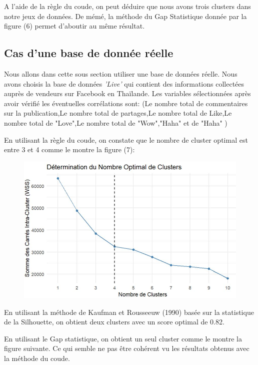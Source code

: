 A l'aide de la règle du coude, on peut déduire que nous avons trois clusters dans notre jeux de données. De mémé, la méthode du Gap Statistique donnée par la figure (6) permet d'aboutir au même résultat. 

\newpage
\subsection{Cas d'une base de donnée réelle}

Nous allons dans cette sous section utiliser une base de données réelle. Nous avons choisis la base de données \textit{'Live'} qui contient des informations collectées auprès de vendeurs sur Facebook en Thaïlande. Les variables sélectionnées après avoir vérifié les éventuelles corrélations sont: (Le nombre total de commentaires sur la publication,Le nombre total de partages,Le nombre total de Like,Le nombre total de "Love",Le nombre total de "Wow","Haha" et de "Haha" )

En utilisant la règle du coude, on constate que le nombre de cluster optimal est entre 3 et 4 comme le montre la figure (7):

\begin{figure}[H]
    \centering
    \includegraphics[width=0.8\linewidth]{images/Coude.JPG}
    \caption{}
    \label{fig:coude}
\end{figure}

En utilisant la méthode de Kaufman et Rousseeuw (1990) basée sur la statistique de la Silhouette, on obtient deux clusters avec un score optimal de 0.82.
 
En utilisant le Gap statistique, on obtient un seul cluster comme le montre la figure suivante. Ce qui semble ne pas être cohérent vu les résultats obtenus avec la méthode du coude. 

